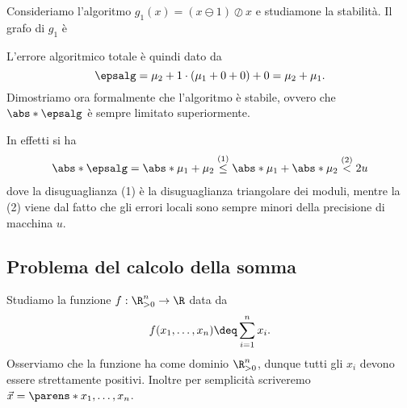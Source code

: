 \begin{example}
    Consideriamo l'algoritmo $g_1(x) = (x \ominus 1) \oslash x$ e studiamone la stabilità. Il grafo di $g_1$ è
    \begin{center}
    \end{center}

    L'errore algoritmico totale è quindi dato da \[
        \epsalg = \mu_2 + 1\cdot(\mu_1 + 0 + 0) + 0 = \mu_2 + \mu_1.
    \] Dimostriamo ora formalmente che l'algoritmo è stabile, ovvero che $\abs*{\epsalg}$ è sempre limitato superiormente.

    In effetti si ha
    \begin{align*}
        \abs*{\epsalg} = \abs*{\mu_1 + \mu_2} \stackrel{(1)}{\leq} \abs*{\mu_1} + \abs*{\mu_2} \stackrel{(2)}{<} 2u
    \end{align*} dove la disuguaglianza (1) è la disuguaglianza triangolare dei moduli, mentre la (2) viene dal fatto che gli errori locali sono sempre minori della precisione di macchina $u$.
\end{example}

\subsection{Problema del calcolo della somma}

Studiamo la funzione $f : \R^n_{> 0} \to \R$ data da \[
    f(x_1, \dots, x_n) \deq \sum_{i=1}^n x_i.  
\] Osserviamo che la funzione ha come dominio $\R^n_{>0}$, dunque tutti gli $x_i$ devono essere strettamente positivi. Inoltre per semplicità scriveremo $\vec x = \parens*{x_1, \dots, x_n}$.

